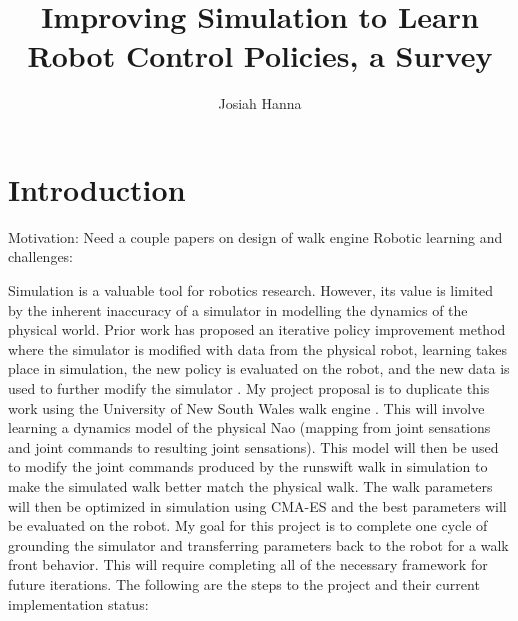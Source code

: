 \documentclass[12 pt]{article}
\author{Josiah Hanna}
\title{Improving Simulation to Learn Robot Control Policies, a Survey}
\begin{document}
\maketitle

\section{Introduction}

Motivation: Need a couple papers on design of walk engine
Robotic learning and challenges: \cite{kober2013reinforcement}


Simulation is a valuable tool for robotics research. 
However, its value is limited by the inherent inaccuracy of a simulator in modelling the dynamics of the physical world. 
Prior work has proposed an iterative policy improvement method where the simulator is modified with data from the physical robot, learning takes place in simulation, the new policy is evaluated on the robot, and the new data is used to further modify the simulator \cite{farchy2013humanoid}.
My project proposal is to duplicate this work using the University of New South Wales walk engine \cite{ashar2014robocup}. 
This will involve learning a dynamics model of the physical Nao (mapping from joint sensations and joint commands to resulting joint sensations). 
This model will then be used to modify the joint commands produced by the runswift walk in simulation to make the simulated walk better match the physical walk. 
The walk parameters will then be optimized in simulation using CMA-ES and the best parameters will be evaluated on the robot. 
My goal for this project is to complete one cycle of grounding the simulator and transferring parameters back to the robot for a walk front behavior. 
This will require completing all of the necessary framework for future iterations.
The following are the steps to the project and their current implementation status:
\end{document}
